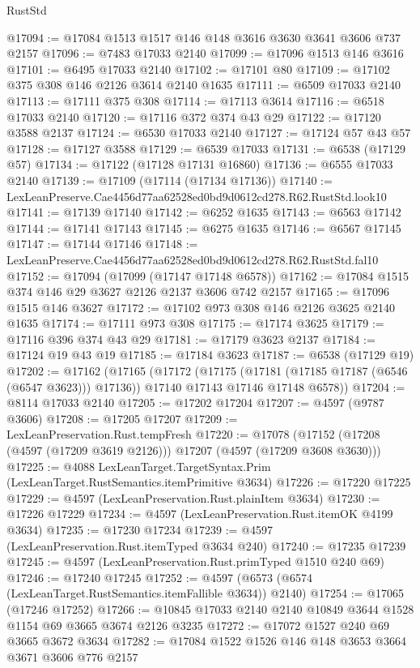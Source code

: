 \begin{lexlean}{RustStd}
\begin{coremodule}
@17094 := @17084 @1513 @1517 @146 @148 @3616 @3630 @3641 @3606 @737 @2157
@17096 := @7483 @17033 @2140
@17099 := @17096 @1513 @146 @3616
@17101 := @6495 @17033 @2140
@17102 := @17101 @80
@17109 := @17102 @375 @308 @146 @2126 @3614 @2140 @1635
@17111 := @6509 @17033 @2140
@17113 := @17111 @375 @308
@17114 := @17113 @3614
@17116 := @6518 @17033 @2140
@17120 := @17116 @372 @374 @43 @29
@17122 := @17120 @3588 @2137
@17124 := @6530 @17033 @2140
@17127 := @17124 @57 @43 @57
@17128 := @17127 @3588
@17129 := @6539 @17033
@17131 := @6538 (@17129 @57)
@17134 := @17122 (@17128 @17131 @16860)
@17136 := @6555 @17033 @2140
@17139 := @17109 (@17114 (@17134 @17136))
@17140 := LexLeanPreserve.Cae4456d77aa62528ed0bd9d0612cd278.R62.RustStd.look10
@17141 := @17139 @17140
@17142 := @6252 @1635
@17143 := @6563 @17142
@17144 := @17141 @17143
@17145 := @6275 @1635
@17146 := @6567 @17145
@17147 := @17144 @17146
@17148 := LexLeanPreserve.Cae4456d77aa62528ed0bd9d0612cd278.R62.RustStd.fal10
@17152 := @17094 (@17099 (@17147 @17148 @6578))
@17162 := @17084 @1515 @374 @146 @29 @3627 @2126 @2137 @3606 @742 @2157
@17165 := @17096 @1515 @146 @3627
@17172 := @17102 @973 @308 @146 @2126 @3625 @2140 @1635
@17174 := @17111 @973 @308
@17175 := @17174 @3625
@17179 := @17116 @396 @374 @43 @29
@17181 := @17179 @3623 @2137
@17184 := @17124 @19 @43 @19
@17185 := @17184 @3623
@17187 := @6538 (@17129 @19)
@17202 := @17162
    (@17165
      (@17172
        (@17175 (@17181 (@17185 @17187 (@6546 (@6547 @3623))) @17136))
        @17140
        @17143
        @17146
        @17148
        @6578))
@17204 := @8114 @17033 @2140
@17205 := @17202 @17204
@17207 := @4597 (@9787 @3606)
@17208 := @17205 @17207
@17209 := LexLeanPreservation.Rust.tempFresh
@17220 := @17078 (@17152 (@17208 (@4597 (@17209 @3619 @2126))) @17207 (@4597 (@17209 @3608 @3630)))
@17225 := @4088 LexLeanTarget.TargetSyntax.Prim (LexLeanTarget.RustSemantics.itemPrimitive @3634)
@17226 := @17220 @17225
@17229 := @4597 (LexLeanPreservation.Rust.plainItem @3634)
@17230 := @17226 @17229
@17234 := @4597 (LexLeanPreservation.Rust.itemOK @4199 @3634)
@17235 := @17230 @17234
@17239 := @4597 (LexLeanPreservation.Rust.itemTyped @3634 @240)
@17240 := @17235 @17239
@17245 := @4597 (LexLeanPreservation.Rust.primTyped @1510 @240 @69)
@17246 := @17240 @17245
@17252 := @4597 (@6573 (@6574 (LexLeanTarget.RustSemantics.itemFallible @3634)) @2140)
@17254 := @17065 (@17246 @17252)
@17266 := @10845 @17033 @2140 @2140 @10849 @3644 @1528 @1154 @69 @3665 @3674 @2126 @3235
@17272 := @17072 @1527 @240 @69 @3665 @3672 @3634
@17282 := @17084 @1522 @1526 @146 @148 @3653 @3664 @3671 @3606 @776 @2157

\end{coremodule}
\end{lexlean}
